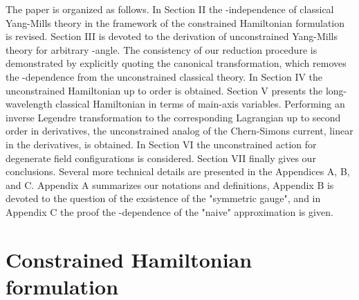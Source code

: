 \documentclass[a4paper,12pt]{article}
\begin{document}
The paper is organized as follows.
In Section II the \myHighlight{$\theta$}\coordHE{}-independence of classical Yang-Mills
theory in the framework of the constrained Hamiltonian formulation is revised.
Section III is devoted to the derivation of
unconstrained \coordHE{} Yang-Mills theory for arbitrary \myHighlight{$\theta$}\coordHE{}-angle.
The consistency of our reduction procedure is demonstrated by
explicitly quoting the canonical transformation,
which removes the \myHighlight{$\theta$}\coordHE{}-dependence from the unconstrained
classical theory.
In Section IV the unconstrained Hamiltonian up to
order \coordHE{} is obtained.
Section V presents the long-wavelength classical
Hamiltonian in terms of main-axis variables.
Performing an inverse Legendre transformation to the corresponding
Lagrangian up to second order in derivatives, the unconstrained analog
of the Chern-Simons current, linear in the derivatives, is obtained.
In Section VI the unconstrained action for degenerate field configurations
is considered.
Section VII finally gives our conclusions.
Several more technical details are presented in the Appendices A, B, and C.
Appendix A summarizes our notations and definitions,
Appendix B is devoted to the question of the exsistence of the "symmetric
gauge", and in Appendix C the proof the \myHighlight{$\theta$}\coordHE{}-dependence of the
"naive" \coordHE{} approximation is given.


\section{Constrained Hamiltonian formulation}


\label{sec:cedg}
\end{document}
